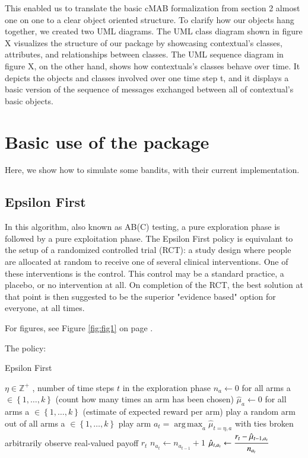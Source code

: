 \documentclass[nojss]{jss}\usepackage[]{graphicx}\usepackage[]{color}
\DeclareMathOperator*{\argmax}{arg\,max}
\begin{document}
This enabled us to translate the basic cMAB formalization from section 2 almost one on one to a clear object oriented structure. To clarify how our objects hang together, we created two UML diagrams. The UML class diagram shown in figure X visualizes the structure of our package by showcasing contextual's classes, attributes, and relationships between classes. The UML sequence diagram in figure X, on the other hand, shows how contextuals's classes behave over time. It depicts the objects and classes involved over one time step t, and it displays a basic version of the sequence of messages exchanged between all of contextual's basic objects.




\section{Basic use of the package}

Here, we show how to simulate some bandits, with their current implementation.

\subsection{Epsilon First}

In this algorithm, also known as AB(C) testing, a pure exploration phase is followed by a pure exploitation phase. The Epsilon First policy is equivalant to the setup of a randomized controlled trial (RCT): a study design where people are allocated at random to receive one of several clinical interventions. One of these interventions is the control. This control may be a standard practice, a placebo, or no intervention at all. On completion of the RCT, the best solution at that point is then suggested to be the superior "evidence based" option for everyone, at all times.

For figures, see Figure \ref{fig:fig1} on page \pageref{fig:fig1}.

The policy:

\begin{algorithm}
\caption{Epsilon First}
\label{Alg:EpsilonFirst}
\begin{algorithmic}
\REQUIRE \(   \eta \in \mathbb{Z}^{+} \)  , number of time steps $t$ in the exploration phase
\STATE \( n_{a} \leftarrow 0 \) for all arms a \(  \in \left\{ 1, \dots, k \right\} \)  (count how many times an arm has been chosen)
\STATE \( \hat{\mu}_{a} \leftarrow 0 \) for all arms a  \(   \in \left\{ 1, \dots, k \right\} \)  (estimate of expected reward per arm)
	       \STATE play a random arm out of all arms a \(   \in \left\{ 1, \dots, k \right\} \)
	\ELSE
	        \STATE play arm \(a_t = \argmax_a  \hat{\mu}_{t=\eta,a}  \) with ties broken arbitrarily
	\ENDIF
	\STATE observe real-valued payoff $r_t$
	\STATE \( n_{a_{t}} \leftarrow n_{a_{t-1}} + 1  \)
   \STATE \( \hat{\mu}_{t,a_{t}} \leftarrow   \cfrac{r_t - \hat{\mu}_{t-1,a_{t}} }{n_{a_{t}}}   \)
\ENDFOR
\end{algorithmic}
\end{algorithm}
\end{document}
